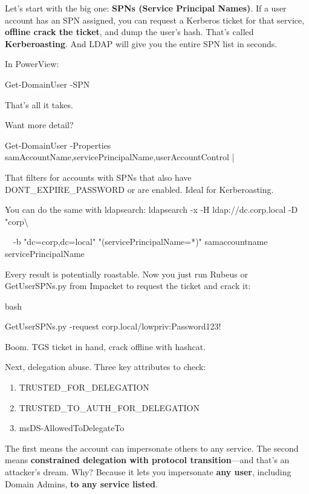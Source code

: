 Let’s start with the big one: \textbf{SPNs (Service Principal Names)}. If a user account has an SPN assigned, you can request a Kerberos ticket for that service, \textbf{offline crack the ticket}, and dump the user’s hash. That’s called \textbf{Kerberoasting}. And LDAP will give you the entire SPN list in seconds.

In PowerView:

Get-DomainUser -SPN

That’s all it takes.

Want more detail?

Get-DomainUser -Properties samAccountName,servicePrincipalName,userAccountControl |


That filters for accounts with SPNs that also have DONT\_EXPIRE\_PASSWORD or are enabled. Ideal for Kerberoasting.

You can do the same with ldapsearch:
ldapsearch -x -H ldap://dc.corp.local -D "corp\textbackslash{}%

  -b "dc=corp,dc=local" "(servicePrincipalName=*)" samaccountname servicePrincipalName

Every result is potentially roastable. Now you just run Rubeus or GetUserSPNs.py from Impacket to request the ticket and crack it:

bash

 

GetUserSPNs.py -request corp.local/lowpriv:Password123!

Boom. TGS ticket in hand, crack offline with hashcat.

Next, delegation abuse. Three key attributes to check:

\begin{enumerate}
    \item TRUSTED\_FOR\_DELEGATION

    \item TRUSTED\_TO\_AUTH\_FOR\_DELEGATION

    \item msDS-AllowedToDelegateTo

\end{enumerate}
The first means the account can impersonate others to any service. The second means \textbf{constrained delegation with protocol transition}—and that's an attacker’s dream. Why? Because it lets you impersonate \textbf{any user}, including Domain Admins, \textbf{to any service listed}.


